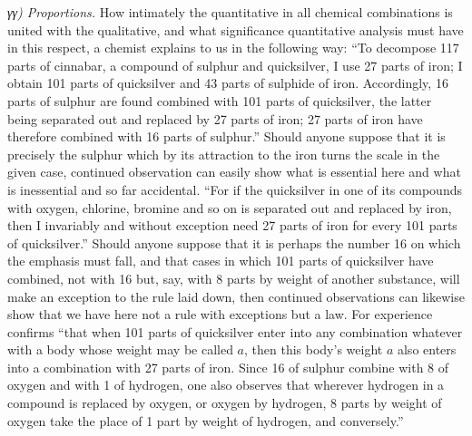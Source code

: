 \documentclass[12pt,a4paper]{book}
\begin{document}
\emph{γγ) Proportions.} How intimately the quantitative in all chemical
combinations is united with the qualitative, and what significance quantitative
analysis must have in this respect, a chemist explains to us in the following
way: ``To decompose 117 parts of cinnabar, a compound of sulphur and
quicksilver, I use 27 parts of iron; I obtain 101 parts of quicksilver and 43
parts of sulphide of iron. Accordingly, 16 parts of sulphur are found combined
with 101 parts of quicksilver, the latter being separated out and replaced by
27 parts of iron; 27 parts of iron have therefore combined with 16 parts of
sulphur.'' Should anyone suppose that it is precisely the sulphur which by its
attraction to the iron turns the scale in the given case, continued observation
can easily show what is essential here and what is inessential and so far
accidental. ``For if the quicksilver in one of its compounds with oxygen,
chlorine, bromine and so on is separated out and replaced by iron, then I
invariably and without exception need 27 parts of iron for every 101 parts of
quicksilver.'' Should anyone suppose that it is perhaps the number 16 on which
the emphasis must fall, and that cases in which 101 parts of quicksilver have
combined, not with 16 but, say, with 8 parts by weight of another substance,
will make an exception to the rule laid down, then continued
\setcounter{footnote}{0}
observations can likewise show that we have here not a rule with exceptions but
a law. For experience confirms ``that when 101 parts of quicksilver enter into
any combination whatever with a body whose weight may be called $a$, then this
body's weight $a$ also enters into a combination with 27 parts of iron. Since
16 of sulphur combine with 8 of oxygen and with 1 of hydrogen, one also
observes that wherever hydrogen in a compound is replaced by oxygen, or oxygen
by hydrogen, 8 parts by weight of oxygen take the place of 1 part by weight of
hydrogen, and conversely.''
\end{document}
